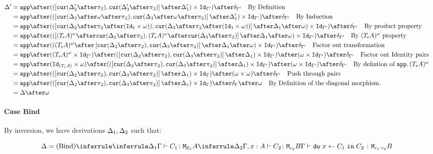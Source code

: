 {    \begin{align}
        \D' & =\app\after((\fld{\cur{\D_2'\after\pp}}{\cur{\D_3'\after\pp}}\after\D_1')\times \Id{\G'})\after\diag{\G'}\qt{By Definition}\\
        & =\app\after((\fld{\cur{\D_2\after\w\after\pp}}{\cur{\D_3\after\w\after\pp}}\after\D_1')\times \Id{\G'})\after\diag{\G'}\qt{By Induction}\\
        & = \app\after((\fld{\cur{\D_2\after\pp\after(\Id{\1}\times \w)}}{\cur{\D_3\after\pp\after(\Id{\1}\times \w)}}\after\D_1\after\w)\times \Id{\G'})\after\diag{\G'}\qt{By product property}\\
        & = \app\after((\fld{(\tea)^{\w}\after\cur{\D_2\after\pp}}{(\tea)^{\w}\after\cur{\D_3\after\pp}}\after\D_1\after\w)\times \Id{\G'})\after\diag{\G'}\qt{By $(\tea)^{\w}$ property}\\
        & = \app\after(((\tea)^{\w}\after\fld{\cur{\D_2\after\pp}}{\cur{\D_3\after\pp}}\after\D_1\after\w)\times \Id{\G'})\after\diag{\G'}\qt{Factor out transformation}\\
        & = \app\after((\tea)^{\w}\times\Id{\G'})\after((\fld{\cur{\D_2\after\pp}}{\cur{\D_3\after\pp}}\after\D_1)\times \Id{\G'})\after(\w \times \Id{\G'})\after\diag{\G'}\qt{Factor out Identity pairs}\\
        & = \app\after(\Id{(\tea)}\times\w)\after((\fld{\cur{\D_2\after\pp}}{\cur{\D_3\after\pp}}\after\D_1) \times \Id{\G'})\after(\w \times \Id{\G'})\after\diag{\G'}\qt{By defintion of $\app, (\tea)^{\w}$}\\
        & = \app\after((\fld{\cur{\D_2\after\pp}}{\cur{\D_3\after\pp}}\after\D_1)\times \idg)\after(\w \times \w)\after\diag{\G'}\qt{Push through pairs}\\
        & = \app\after((\fld{\cur{\D_2\after\pp}}{\cur{\D_3\after\pp}}\after\D_1)\times \idg)\after\diag{\G}\after\w\qt{By Definition of the diagonal morphism.}\\
        & = \D\after\w
    \end{align}
    
    
    \paragraph{Case Bind}
    By inversion, we have derivations $\Delta_1, \Delta_2$ such that:
    
    
    \begin{equation}
        \D = \ntreeruleII{Bind}{
            \treeruleI{\D_1}{\typerelation{\G}{C_1}{\M{\E_1}{A}}}
            }{
            \treeruleI{\D_2}{\typerelation{\G,x: A}{C_2}{\M{\e_2}{B}}}
        }{
            \typerelation{\G}{\doin{x}{C_1}{C_2}}{\M{\e_1\dot\e_2}{B}}
        }
    \end{equation}
    
}
